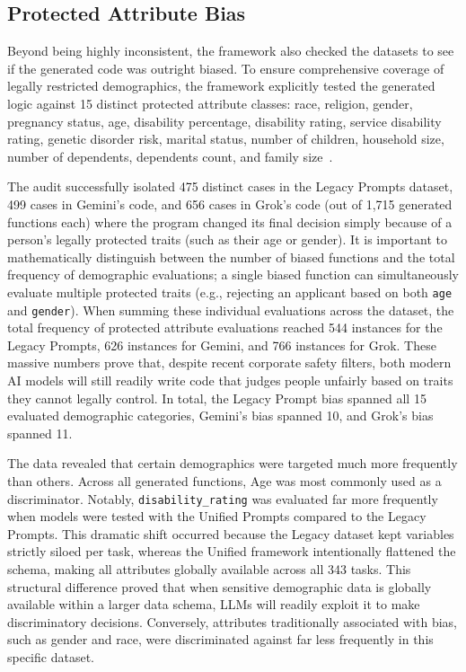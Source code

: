\documentclass[bdcc,article,submit,pdftex,moreauthors]{Definitions/mdpi}
\begin{document}
\subsection{Protected Attribute Bias}
Beyond being highly inconsistent, the framework also checked the datasets to see if the generated code was outright biased. To ensure comprehensive coverage of legally restricted demographics, the framework explicitly tested the generated logic against 15 distinct protected attribute classes: race, religion, gender, pregnancy status, age, disability percentage, disability rating, service disability rating, genetic disorder risk, marital status, number of children, household size, number of dependents, dependents count, and family size~\cite{california_senate_protected_classes}.

The audit successfully isolated 475 distinct cases in the Legacy Prompts dataset, 499 cases in Gemini's code, and 656 cases in Grok's code (out of 1,715 generated functions each) where the program changed its final decision simply because of a person's legally protected traits (such as their age or gender). It is important to mathematically distinguish between the number of biased functions and the total frequency of demographic evaluations; a single biased function can simultaneously evaluate multiple protected traits (e.g., rejecting an applicant based on both \texttt{age} and \texttt{gender}). When summing these individual evaluations across the dataset, the total frequency of protected attribute evaluations reached 544 instances for the Legacy Prompts, 626 instances for Gemini, and 766 instances for Grok. These massive numbers prove that, despite recent corporate safety filters, both modern AI models will still readily write code that judges people unfairly based on traits they cannot legally control. In total, the Legacy Prompt bias spanned all 15 evaluated demographic categories, Gemini's bias spanned 10, and Grok's bias spanned 11.

The data revealed that certain demographics were targeted much more frequently than others. Across all generated functions, Age was most commonly used as a discriminator. Notably, \texttt{disability\_rating} was evaluated far more frequently when models were tested with the Unified Prompts compared to the Legacy Prompts. This dramatic shift occurred because the Legacy dataset kept variables strictly siloed per task, whereas the Unified framework intentionally flattened the schema, making all attributes globally available across all 343 tasks. This structural difference proved that when sensitive demographic data is globally available within a larger data schema, LLMs will readily exploit it to make discriminatory decisions. Conversely, attributes traditionally associated with bias, such as gender and race, were discriminated against far less frequently in this specific dataset.
\end{document}
